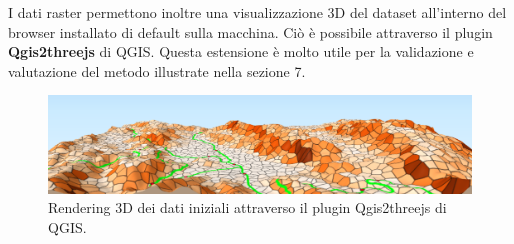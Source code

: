 I dati raster permettono inoltre una visualizzazione 3D del dataset all'interno del browser installato di default sulla macchina. Ciò è possibile attraverso il plugin \textbf{Qgis2threejs} di QGIS. Questa estensione è molto utile per la validazione e valutazione del metodo illustrate nella sezione 7.

\begin{figure}[h]
	\centering
	\includegraphics[width=1\textwidth]{images/Threejs}
	\caption{Rendering 3D dei dati iniziali attraverso il plugin Qgis2threejs di QGIS.}
	\label{threejs}
\end{figure}